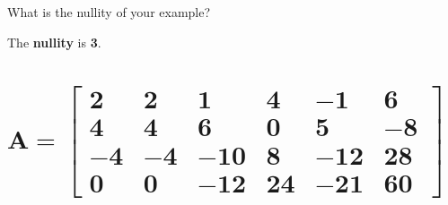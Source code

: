 \documentclass[
  letterpaper,
  DIV=11,
  numbers=noendperiod]{scrartcl}
\begin{document}
What is the nullity of your example?

The \textbf{nullity} is \textbf{3}.

\newpage{}

\hypertarget{symbfa-beginbmatrix2-2-1-4--1-6-4-4-6-0-5--8--4--4--10-8--12-28-0-0--12-24--21-60endbmatrix}{%
\section{\texorpdfstring{\(\symbf{A = \begin{bmatrix}2 & 2 & 1 & 4 & -1 & 6 \\ 4 & 4 & 6 & 0 & 5 & -8 \\ -4 & -4 & -10 & 8 & -12 & 28 \\ 0 & 0 & -12 & 24 & -21 & 60\end{bmatrix}}\)}{\textbackslash symbf\{A = \textbackslash begin\{bmatrix\}2 \& 2 \& 1 \& 4 \& -1 \& 6 \textbackslash\textbackslash{} 4 \& 4 \& 6 \& 0 \& 5 \& -8 \textbackslash\textbackslash{} -4 \& -4 \& -10 \& 8 \& -12 \& 28 \textbackslash\textbackslash{} 0 \& 0 \& -12 \& 24 \& -21 \& 60\textbackslash end\{bmatrix\}\}}}\label{symbfa-beginbmatrix2-2-1-4--1-6-4-4-6-0-5--8--4--4--10-8--12-28-0-0--12-24--21-60endbmatrix}}
\end{document}
